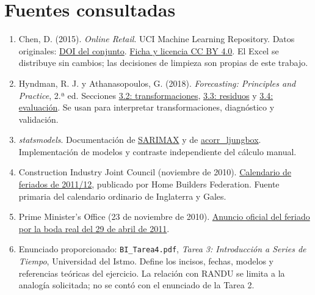 \documentclass[11pt,letterpaper]{article}
\begin{document}
\section{Fuentes consultadas}
\begin{enumerate}
\item Chen, D. (2015). \textit{Online Retail}. UCI Machine Learning Repository. Datos originales: \href{https://doi.org/10.24432/C5BW33}{DOI del conjunto}. \href{https://archive.ics.uci.edu/dataset/352/online+retail}{Ficha y licencia CC BY 4.0}. El Excel se distribuye sin cambios; las decisiones de limpieza son propias de este trabajo.
\item Hyndman, R. J. y Athanasopoulos, G. (2018). \textit{Forecasting: Principles and Practice}, 2.ª ed. Secciones \href{https://otexts.com/fpp2/transformations.html}{3.2: transformaciones}, \href{https://otexts.com/fpp2/residuals.html}{3.3: residuos} y \href{https://otexts.com/fpp2/accuracy.html}{3.4: evaluación}. Se usan para interpretar transformaciones, diagnóstico y validación.
\item \textit{statsmodels}. Documentación de \href{https://www.statsmodels.org/stable/generated/statsmodels.tsa.statespace.sarimax.SARIMAX.html}{SARIMAX} y de \href{https://www.statsmodels.org/stable/generated/statsmodels.stats.diagnostic.acorr_ljungbox.html}{acorr\_ljungbox}. Implementación de modelos y contraste independiente del cálculo manual.
\item Construction Industry Joint Council (noviembre de 2010). \href{https://www.hbf.co.uk/documents/5435/Holidays_2011_Promulgation.pdf}{Calendario de feriados de 2011/12}, publicado por Home Builders Federation. Fuente primaria del calendario ordinario de Inglaterra y Gales.
\item Prime Minister's Office (23 de noviembre de 2010). \href{https://www.gov.uk/government/news/pm-welcomes-announcement-of-date-for-royal-wedding}{Anuncio oficial del feriado por la boda real del 29 de abril de 2011}.
\item Enunciado proporcionado: \texttt{BI\_Tarea4.pdf}, \textit{Tarea 3: Introducción a Series de Tiempo}, Universidad del Istmo. Define los incisos, fechas, modelos y referencias teóricas del ejercicio. La relación con RANDU se limita a la analogía solicitada; no se contó con el enunciado de la Tarea 2.
\end{enumerate}
\end{document}

